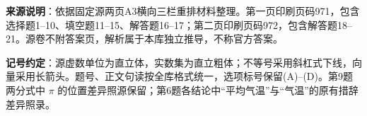 


\begin{gktip}
\textbf{来源说明}：依据固定源两页A3横向三栏重排材料整理。第一页印刷页码971，包含选择题1–10、填空题11–15、解答题16–17；第二页印刷页码972，包含解答题18–21。源卷不附答案页，解析属于本库独立推导，不称官方答案。

\textbf{记号约定}：源虚数单位为直立体，实数集为直立粗体；不等号采用斜杠式下线，向量采用长箭头。题号、正文句读按全库格式统一，选项标号保留(A)–(D)。第9题两分式中 \(\pi\) 的位置差异照源保留；第6题各结论中“平均气温”与“气温”的原有措辞差异照录。
\end{gktip}



